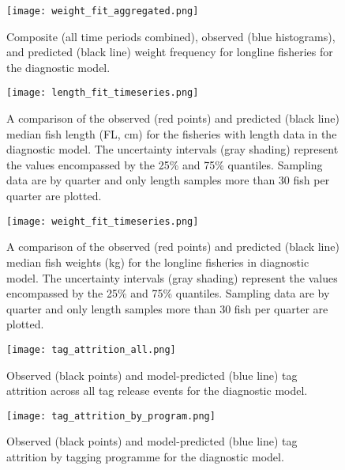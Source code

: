 \newpage
\begin{figure}[!ht]
  \centering
  \texttt{[image: weight\_fit\_aggregated.png]}
  \caption{Composite (all time periods combined), observed (blue histograms), and predicted (black line) weight frequency for longline fisheries for the diagnostic model. \label{fig:weight_fit_aggregated}}
\end{figure}
\clearpage

\newpage
\begin{landscape}
  \begin{figure}[!ht]
    \centering
    \texttt{[image: length\_fit\_timeseries.png]}
    \caption{A comparison of the observed (red points) and predicted (black line) median fish length (FL, cm) for the fisheries with length data in the diagnostic model. The uncertainty intervals (gray shading) represent the values encompassed by the 25\% and 75\% quantiles. Sampling data are by quarter and only length samples more than 30 fish per quarter are plotted. \label{fig:length_fit_timeseries}}
  \end{figure}
\end{landscape}
\clearpage

\newpage
\begin{landscape}
  \begin{figure}[!ht]
    \centering
    \texttt{[image: weight\_fit\_timeseries.png]}
    \caption{A comparison of the observed (red points) and predicted (black line) median fish weights (kg) for the longline fisheries in diagnostic model. The uncertainty intervals (gray shading) represent the values encompassed by the 25\% and 75\% quantiles. Sampling data are by quarter and only length samples more than 30 fish per quarter are plotted. \label{fig:weight_fit_timeseries}}
  \end{figure}
\end{landscape}
\clearpage

\newpage
\begin{figure}[!ht]
  \centering
  \texttt{[image: tag\_attrition\_all.png]}
  \caption{Observed (black points) and model-predicted (blue line) tag attrition across all tag release events for the diagnostic model. \label{fig:tag_attrition_all}}
\end{figure}
\clearpage

\newpage
\begin{figure}[!ht]
  \centering
  \texttt{[image: tag\_attrition\_by\_program.png]}
  \caption{Observed (black points) and model-predicted (blue line) tag attrition by tagging programme for the diagnostic model. \label{fig:tag_attrition_by_program}}
\end{figure}
\clearpage

